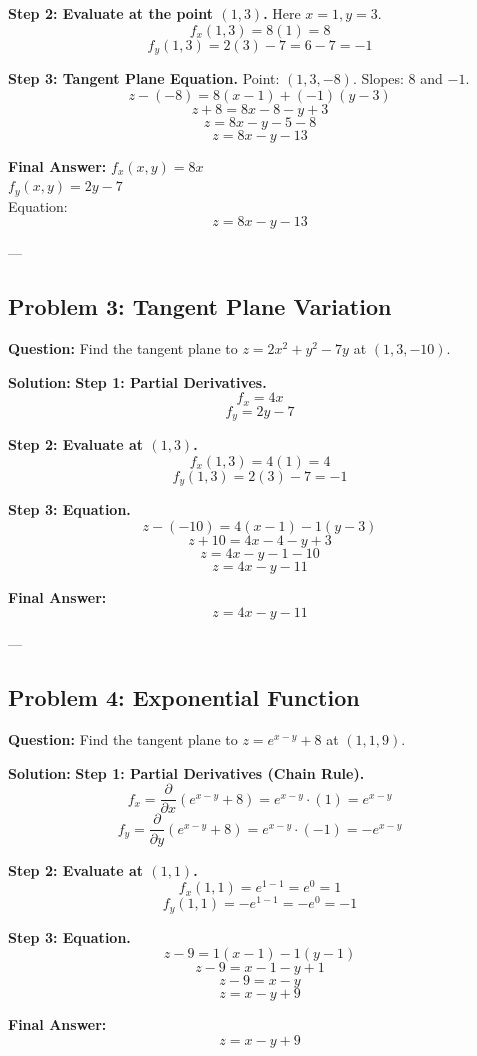 \documentclass{article}
\begin{document}
\textbf{Step 2: Evaluate at the point $(1, 3)$.}
Here $x=1, y=3$.
\[ f_x(1, 3) = 8(1) = 8 \]
\[ f_y(1, 3) = 2(3) - 7 = 6 - 7 = -1 \]

\textbf{Step 3: Tangent Plane Equation.}
Point: $(1, 3, -8)$. Slopes: $8$ and $-1$.
\[ z - (-8) = 8(x - 1) + (-1)(y - 3) \]
\[ z + 8 = 8x - 8 - y + 3 \]
\[ z = 8x - y - 5 - 8 \]
\[ z = 8x - y - 13 \]

\textbf{Final Answer:}
$f_x(x,y) = 8x$ \\
$f_y(x,y) = 2y - 7$ \\
Equation: \[ z = 8x - y - 13 \]

---

\subsection*{Problem 3: Tangent Plane Variation}
\textbf{Question:} Find the tangent plane to $z = 2x^2 + y^2 - 7y$ at $(1, 3, -10)$.

\textbf{Solution:}
\textbf{Step 1: Partial Derivatives.}
\[ f_x = 4x \]
\[ f_y = 2y - 7 \]

\textbf{Step 2: Evaluate at $(1, 3)$.}
\[ f_x(1, 3) = 4(1) = 4 \]
\[ f_y(1, 3) = 2(3) - 7 = -1 \]

\textbf{Step 3: Equation.}
\[ z - (-10) = 4(x - 1) - 1(y - 3) \]
\[ z + 10 = 4x - 4 - y + 3 \]
\[ z = 4x - y - 1 - 10 \]
\[ z = 4x - y - 11 \]

\textbf{Final Answer:} \[ z = 4x - y - 11 \]

---

\subsection*{Problem 4: Exponential Function}
\textbf{Question:} Find the tangent plane to $z = e^{x-y} + 8$ at $(1, 1, 9)$.

\textbf{Solution:}
\textbf{Step 1: Partial Derivatives (Chain Rule).}
\[ f_x = \frac{\partial}{\partial x}(e^{x-y} + 8) = e^{x-y} \cdot (1) = e^{x-y} \]
\[ f_y = \frac{\partial}{\partial y}(e^{x-y} + 8) = e^{x-y} \cdot (-1) = -e^{x-y} \]

\textbf{Step 2: Evaluate at $(1, 1)$.}
\[ f_x(1, 1) = e^{1-1} = e^0 = 1 \]
\[ f_y(1, 1) = -e^{1-1} = -e^0 = -1 \]

\textbf{Step 3: Equation.}
\[ z - 9 = 1(x - 1) - 1(y - 1) \]
\[ z - 9 = x - 1 - y + 1 \]
\[ z - 9 = x - y \]
\[ z = x - y + 9 \]

\textbf{Final Answer:} \[ z = x - y + 9 \]
\end{document}
